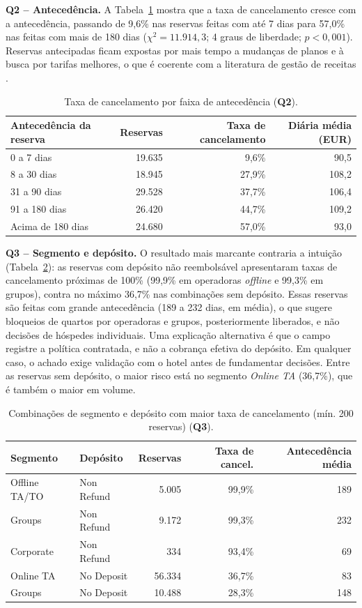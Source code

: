\documentclass[11pt,a4paper]{article}
\newcommand{\Q}[1]{\textbf{Q#1}}
\begin{document}
\textbf{Q2 -- Antecedência.} A Tabela~\ref{tab:q2} mostra que a taxa de cancelamento cresce com a antecedência, passando de 9,6\% nas reservas feitas com até 7 dias para 57,0\% nas feitas com mais de 180 dias ($\chi^2 = 11.914{,}3$; 4 graus de liberdade; $p < 0{,}001$). Reservas antecipadas ficam expostas por mais tempo a mudanças de planos e à busca por tarifas melhores, o que é coerente com a literatura de gestão de receitas \citep{talluri2004}.

\begin{table}[!htb]
\centering\small
\caption{Taxa de cancelamento por faixa de antecedência (\Q{2}).}\label{tab:q2}
\begin{tabular}{@{}lrrr@{}}
\toprule
\textbf{Antecedência da reserva} & \textbf{Reservas} & \textbf{Taxa de cancelamento} & \textbf{Diária média (EUR)} \\
\midrule
0 a 7 dias & 19.635 & 9,6\% & 90,5 \\
8 a 30 dias & 18.945 & 27,9\% & 108,2 \\
31 a 90 dias & 29.528 & 37,7\% & 106,4 \\
91 a 180 dias & 26.420 & 44,7\% & 109,2 \\
Acima de 180 dias & 24.680 & 57,0\% & 93,0 \\
\bottomrule
\end{tabular}
\end{table}

\textbf{Q3 -- Segmento e depósito.} O resultado mais marcante contraria a intuição (Tabela~\ref{tab:q3}): as reservas com depósito não reembolsável apresentaram taxas de cancelamento próximas de 100\% (99,9\% em operadoras \textit{offline} e 99,3\% em grupos), contra no máximo 36,7\% nas combinações sem depósito. Essas reservas são feitas com grande antecedência (189 a 232 dias, em média), o que sugere bloqueios de quartos por operadoras e grupos, posteriormente liberados, e não decisões de hóspedes individuais. Uma explicação alternativa é que o campo registre a política contratada, e não a cobrança efetiva do depósito. Em qualquer caso, o achado exige validação com o hotel antes de fundamentar decisões. Entre as reservas sem depósito, o maior risco está no segmento \textit{Online TA} (36,7\%), que é também o maior em volume.

\begin{table}[!htb]
\centering\small
\caption{Combinações de segmento e depósito com maior taxa de cancelamento (mín. 200 reservas) (\Q{3}).}\label{tab:q3}
\begin{tabular}{@{}llrrr@{}}
\toprule
\textbf{Segmento} & \textbf{Depósito} & \textbf{Reservas} & \textbf{Taxa de cancel.} & \textbf{Antecedência média} \\
\midrule
Offline TA/TO & Non Refund & 5.005 & 99,9\% & 189 \\
Groups & Non Refund & 9.172 & 99,3\% & 232 \\
Corporate & Non Refund & 334 & 93,4\% & 69 \\
Online TA & No Deposit & 56.334 & 36,7\% & 83 \\
Groups & No Deposit & 10.488 & 28,3\% & 148 \\
\bottomrule
\end{tabular}
\end{table}
\end{document}

